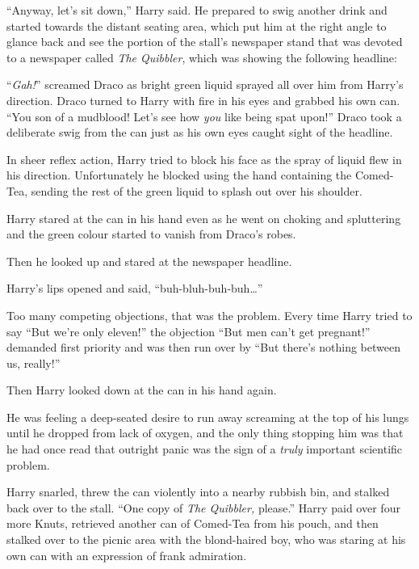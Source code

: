 “Anyway, let’s sit down,” Harry said. He prepared to swig another drink and started towards the distant seating area, which put him at the right angle to glance back and see the portion of the stall’s newspaper stand that was devoted to a newspaper called \emph{The Quibbler}, which was showing the following headline:


“\emph{Gah!}” screamed Draco as bright green liquid sprayed all over him from Harry’s direction. Draco turned to Harry with fire in his eyes and grabbed his own can. “You son of a mudblood! Let’s see how \emph{you} like being spat upon!” Draco took a deliberate swig from the can just as his own eyes caught sight of the headline.

In sheer reflex action, Harry tried to block his face as the spray of liquid flew in his direction. Unfortunately he blocked using the hand containing the Comed-Tea, sending the rest of the green liquid to splash out over his shoulder.

Harry stared at the can in his hand even as he went on choking and spluttering and the green colour started to vanish from Draco’s robes.

Then he looked up and stared at the newspaper headline.


Harry’s lips opened and said, “buh-bluh-buh-buh…”

Too many competing objections, that was the problem. Every time Harry tried to say “But we’re only eleven!” the objection “But men can’t get pregnant!” demanded first priority and was then run over by “But there’s nothing between us, really!”

Then Harry looked down at the can in his hand again.

He was feeling a deep-seated desire to run away screaming at the top of his lungs until he dropped from lack of oxygen, and the only thing stopping him was that he had once read that outright panic was the sign of a \emph{truly} important scientific problem.

Harry snarled, threw the can violently into a nearby rubbish bin, and stalked back over to the stall. “One copy of \emph{The Quibbler,} please.” Harry paid over four more Knuts, retrieved another can of Comed-Tea from his pouch, and then stalked over to the picnic area with the blond-haired boy, who was staring at his own can with an expression of frank admiration.

